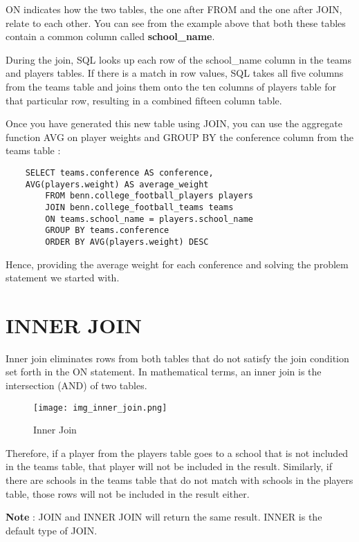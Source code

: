 \documentclass[12pt, letterpaper]{article}
\begin{document}
ON indicates how the two tables, the one after FROM and the one after JOIN, relate to each other. You can see from the example above that both these tables contain a common column called \textbf{school\_name}.

During the join, SQL looks up each row of the school\_name column in the teams and players tables. If there is a match in row values, SQL takes all five columns from the teams table and joins them onto the ten columns of players table for that particular row, resulting in a combined fifteen column table.

Once you have generated this new table using JOIN, you can use the aggregate function AVG on player weights and GROUP BY the conference column from the teams table :  

\begin{verbatim}
    SELECT teams.conference AS conference, 
    AVG(players.weight) AS average_weight
        FROM benn.college_football_players players
        JOIN benn.college_football_teams teams
        ON teams.school_name = players.school_name
        GROUP BY teams.conference
        ORDER BY AVG(players.weight) DESC
\end{verbatim}

Hence, providing the average weight for each conference and solving the problem statement we started with.


\section{INNER JOIN}
Inner join eliminates rows from both tables that do not satisfy the join condition set forth in the ON statement. In mathematical terms, an inner join is the intersection (AND) of two tables.

\begin{figure}[H]
    \centering
    \texttt{[image: img\_inner\_join.png]}
    \caption{Inner Join}
    \label{innerjoin}
\end{figure}

Therefore, if a player from the players table goes to a school that is not included in the teams table, that player will not be included in the result. Similarly, if there are schools in the teams table that do not match with schools in the players table, those rows will not be included in the result either.

\begin{displayquote}
    \textbf{Note} : JOIN and INNER JOIN will return the same result. INNER is the default type of JOIN.
\end{displayquote}
\end{document}
